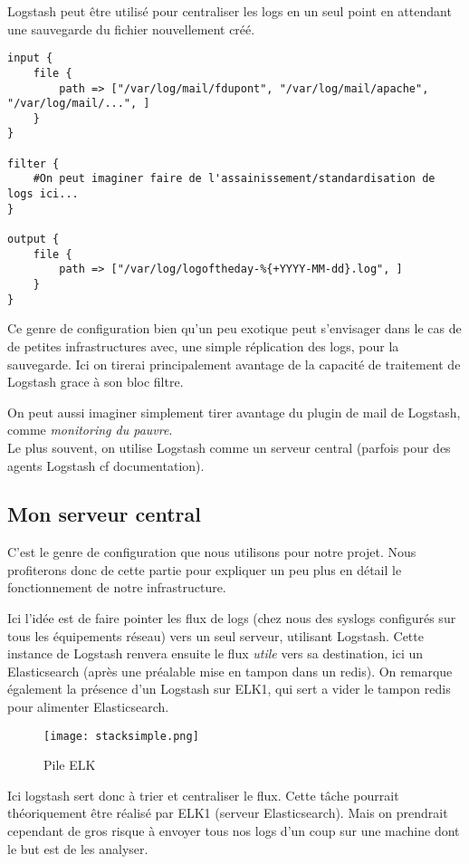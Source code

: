 Logstash peut être utilisé pour centraliser les logs en un seul point en attendant
une sauvegarde du fichier nouvellement créé.


\begin{lstlisting}[style=logstash,label={lst:conflogstashminimale2},caption={Un autre exemple de configuration minime}]
input {
    file {
        path => ["/var/log/mail/fdupont", "/var/log/mail/apache", "/var/log/mail/...", ]
    }
}

filter {
    #On peut imaginer faire de l'assainissement/standardisation de logs ici...
}

output {
    file {
        path => ["/var/log/logoftheday-%{+YYYY-MM-dd}.log", ]
    }
}
\end{lstlisting}
Ce genre de configuration bien qu'un peu exotique peut s'envisager dans le cas de
de petites infrastructures avec, une simple réplication des logs, pour la sauvegarde.
Ici on tirerai principalement avantage de la capacité de traitement de Logstash grace
à son bloc filtre.

On peut aussi imaginer simplement tirer avantage du plugin de mail de Logstash, 
comme \textit{monitoring du pauvre}.\\[4mm]

Le plus souvent, on utilise Logstash comme un serveur central (parfois pour 
des agents Logstash cf documentation).

\subsection{Mon serveur central}
C'est le genre de configuration que nous utilisons pour notre projet. Nous profiterons
donc de cette partie pour expliquer un peu plus en détail le fonctionnement de notre
infrastructure.

Ici l'idée est de faire pointer les flux de \gls{logs} (chez nous des syslogs configurés 
sur tous les équipements réseau) vers un seul serveur, utilisant Logstash. Cette 
instance de Logstash renvera ensuite le flux \textit{utile} vers sa destination, 
ici un Elasticsearch (après une préalable mise en tampon dans un redis).
On remarque également la présence d'un Logstash sur ELK1, qui sert a vider le tampon
redis pour alimenter Elasticsearch.
\begin{figure}[H]
\center
\texttt{[image: stacksimple.png]}
\label{fig:elkstack1}
\caption{Pile ELK}
\end{figure}

Ici logstash sert donc à trier et centraliser le flux. Cette tâche pourrait théoriquement 
être réalisé par ELK1 (serveur Elasticsearch).
Mais on prendrait cependant de gros risque à envoyer tous nos logs d'un coup sur une machine
dont le but est de les analyser.

